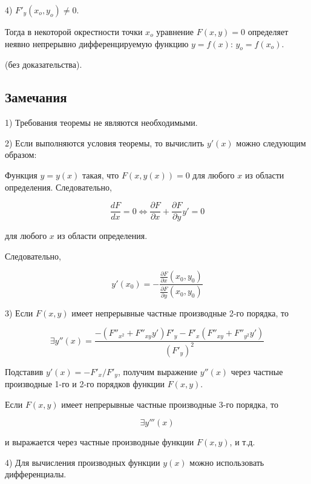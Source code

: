 {4) \( F'_y (x_o, y_o) \neq 0 \).

Тогда в некоторой окрестности точки \( x_o \) уравнение \( F(x,y)=0 \) определяет неявно непрерывно дифференцируемую функцию \( y = f(x) \): \( y_o = f(x_o) \).

(без доказательства).


\subsection*{Замечания}

1) Требования теоремы не являются необходимыми.

2) Если выполняются условия теоремы, то вычислить \( y'(x) \) можно следующим образом:

Функция \( y = y(x) \) такая, что \( F(x, y(x)) = 0 \) для любого \( x \) из области определения. Следовательно,



\[
\frac{dF}{dx} = 0 \iff \frac{\partial F}{\partial x} + \frac{\partial F}{\partial y} y' = 0
\]



для любого \( x \) из области определения.

Следовательно,



\[
y'(x_0) = -\frac{\frac{\partial F}{\partial x}(x_0, y_0)}{\frac{\partial F}{\partial y}(x_0, y_0)}
\]



3) Если \( F(x,y) \) имеет непрерывные частные производные 2-го порядка, то



\[
\exists y''(x) = \frac{-(F''_{x^2} + F''_{xy} y')F'_y - F'_x (F''_{xy} + F''_{y^2} y')}{(F'_y)^2}
\]



Подставив \( y'(x) = -F'_x / F'_y \), получим выражение \( y''(x) \) через частные производные 1-го и 2-го порядков функции \( F(x, y) \).

Если \( F(x,y) \) имеет непрерывные частные производные 3-го порядка, то



\[
\exists y'''(x)
\]



и выражается через частные производные функции \( F(x,y) \), и т.д.

4) Для вычисления производных функции \( y(x) \) можно использовать дифференциалы.



}